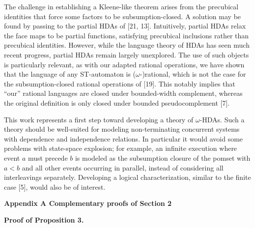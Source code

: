 \documentclass[10pt,a4paper]{article}
\begin{document}
 
 
The challenge in establishing a Kleene-like theorem arises from the precubical identities that force some factors to be subsumption-closed. A solution may be found by passing to the partial HDAs of [21, 13]. Intuitively, partial HDAs relax the face maps to be partial functions, satisfying precubical inclusions rather than precubical identities. However, while the language theory of HDAs has seen much recent progress, partial HDAs remain largely unexplored. The use of such objects is particularly relevant, as with our adapted rational operations, we have shown that the language of any ST-automaton is ($\omega$-)rational, which is not the case for the subsumption-closed rational operations of [19]. This notably implies that “our” rational languages are closed under bounded-width complement, whereas the original definition is only closed under bounded pseudocomplement [7].\par
 
 
 
This work represents a first step toward developing a theory of $\omega$-HDAs. Such a theory should be well-suited for modeling non-terminating concurrent systems with dependence and independence relations. In particular it would avoid some problems with state-space explosion; for example, an infinite execution where event $a$ must precede $b$ is modeled as the subsumption closure of the pomset with $a<b$ and all other events occurring in parallel, instead of considering all interleavings separately. Developing a logical characterization, similar to the finite case [5], would also be of interest.\par
 
  


 
\par\medskip\noindent\textbf{Appendix A Complementary proofs of Section 2}\par
 
 
\par\medskip\noindent\textbf{Proof of Proposition 3.}\par
 
 
\end{document}
